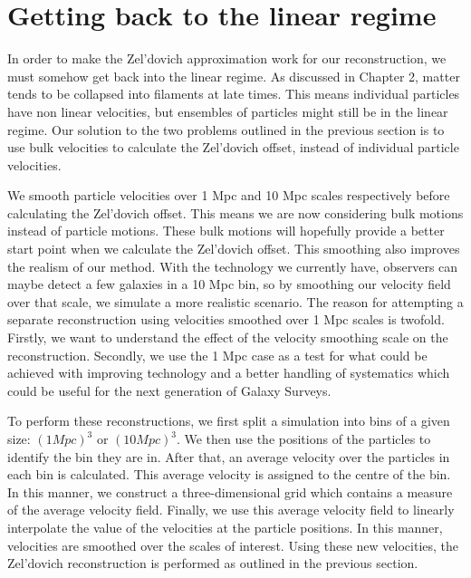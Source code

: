 \section{Getting back to the linear regime}

In order to make the Zel'dovich approximation work for our reconstruction, we must somehow get back into the linear regime. As discussed in Chapter 2, matter tends to be collapsed into filaments at late times. This means individual particles have non linear velocities, but ensembles of particles might still be in the linear regime. Our solution to the two problems outlined in the previous section is to use bulk velocities to calculate the Zel'dovich offset, instead of individual particle velocities.

We smooth particle velocities over 1 Mpc and 10 Mpc scales respectively before calculating the Zel'dovich offset. This means we are now considering bulk motions instead of particle motions. These bulk motions will hopefully provide a better start point when we calculate the Zel'dovich offset. This smoothing also improves the realism of our method. With the technology we currently have, observers can maybe detect a few galaxies in a 10 Mpc bin, so by smoothing our velocity field over that scale, we simulate a more realistic scenario. The reason for attempting a separate reconstruction using velocities smoothed over 1 Mpc scales is twofold. Firstly, we want to understand the effect of the velocity smoothing scale on the reconstruction. Secondly, we use the 1 Mpc case as a test for what could be achieved with improving technology and a better handling of systematics which could be useful for the next generation of Galaxy Surveys.

To perform these reconstructions, we first split a simulation into bins of a given size: $(1 Mpc)^3$ or $(10 Mpc)^3$. We then use the positions of the particles to identify the bin they are in. After that, an average velocity over the particles in each bin is calculated. This average velocity is assigned to the centre of the bin. In this manner, we construct a three-dimensional grid which contains a measure of the average velocity field. Finally, we use this average velocity field to linearly interpolate the value of the velocities at the particle positions. In this manner, velocities are smoothed over the scales of interest. Using these new velocities, the Zel'dovich reconstruction is performed as outlined in the previous section.

